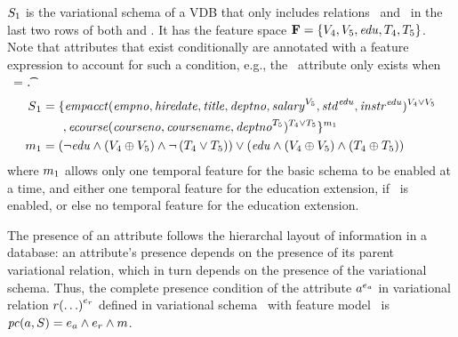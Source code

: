 \begin{example}
\label{eg:vsch}
$\vSch_1$ is the variational schema of a VDB that only includes relations \empacct\ and \ecourse\ in the last two rows
of both  and . It has the
feature space 
\ensuremath{\fSet = \setDef{ \vFour, \vFive, \edu, \tFour, \tFive}}.
Note that attributes that exist conditionally are annotated with a feature expression
to account for such a condition, e.g., the \salary\ attribute only exists when \vFive\ = \t.
%
\begin{align*}
\vSch_1 &=
\{ \empacct ( \empno, \hiredate, \titleatt, \deptno, \annot [\vFive] \salary, 
 \annot [\edu] \isstudent,
\annot [\edu] \isteacher )^{\vFour \vee \vFive}\\
%
&\hspace{17pt}, \ecourse ( \cno, \cname, \annot [\tFive] \deptno )^{\tFour \vee \tFive} \}^{\fModel_1}\\
\fModel_1 &= 
\paran {\neg \edu \wedge \paran {\vFour \oplus \vFive} \wedge \neg \paran {\tFour \vee \tFive}
 }
\vee
\paran {\edu \wedge \paran {\vFour \oplus \vFive}
\wedge
\paran {\tFour \oplus \tFive}}
\end{align*}
where \ensuremath{\fModel_1} allows only one temporal feature for the basic
schema to be enabled at a time, and either one temporal feature for the education
extension, if \edu\ is enabled, or else no temporal feature for the education
extension.
\end{example}



The presence of an attribute follows the hierarchal layout of information in a database:
an attribute's presence depends on the presence of its parent variational relation, which in turn 
depends on the presence of the variational schema. 
%
Thus, the complete presence condition of the attribute
$\annot[\dimMeta_\vAtt]{\vAtt}$ in variational relation
$\vRel\annot[\dimMeta_\vRel]{(\ldots)}$ defined in variational schema \vSch\ with feature
model \fModel\ is
$\getPCfrom{\vAtt}{\vSch}=\dimMeta_\vAtt\wedge\dimMeta_\vRel\wedge\fModel$.

